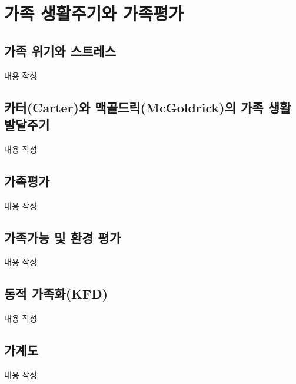 \section{가족 생활주기와 가족평가}

\subsection{가족 위기와 스트레스}
내용 작성

\subsection{카터(Carter)와 맥골드릭(McGoldrick)의 가족 생활 발달주기}
내용 작성

\subsection{가족평가}
내용 작성

\subsection{가족가능 및 환경 평가}
내용 작성

\subsection{동적 가족화(KFD)}
내용 작성

\subsection{가계도}
내용 작성
